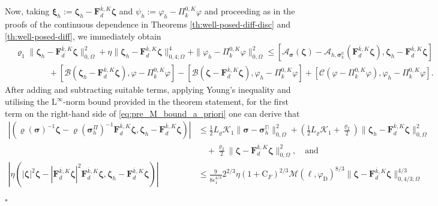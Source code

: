 \documentclass[fleqn,a4paper]{cas-sc}
\newcommand{\bF}{\mathbf{F}}
\newcommand{\bxi}{\boldsymbol{\xi}}
\newcommand{\bzeta}{\boldsymbol{\zeta}}
\newcommand{\0}{\boldsymbol{0}}
\newcommand\bbPi{\mathbb{\Pi}}
\newcommand\bsigma{\boldsymbol{\sigma}}
\numberwithin{equation}{section}
\numberwithin{figure}{section}
\newenvironment{proof}{\noindent{\it Proof.}}{\hfill$\square$}
\begin{document}
\begin{proof}
\begin{subequations}
\end{subequations}
Now, taking $\bxi_h:=\bzeta_h - \bF_d^{\overline{k},K}\bzeta$ and $\psi_h:=\varphi_h-\Pi_k^{0,K}\varphi$ and proceeding as in the proofs of the continuous dependence in Theorems \ref{th:well-posed-diff-disc} and \ref{th:well-posed-diff}, we immediately obtain
\begin{align}\label{eq:pre_M_bound_a_priori}
        &\varrho_1\|\bzeta_h - \bF_d^{\overline{k},K}\bzeta\|_{0,\Omega}^2+{\eta} \|\bzeta_h - \bF_d^{\overline{k},K}\bzeta\|_{0,4;\Omega}^4 + \|\varphi_h-\Pi_k^{0,K}\varphi\|_{0, \Omega}^2 \le  [\mathcal{A}_{\bsigma}(\bzeta)-\mathcal{A}_{h,\bsigma_h^{\bbPi}}(\bF_d^{\overline{k},K}\bzeta),\bzeta_h - \bF_d^{\overline{k},K}\bzeta]\nonumber \\
        & \qquad \qquad  +[\mathcal{B}(\bzeta_h - \bF_d^{\overline{k},K}\bzeta), \varphi-\Pi_k^{0,K}\varphi]- [\mathcal{B}(\bzeta - \bF_d^{\overline{k},K}\bzeta), \varphi_h-\Pi_k^{0,K}\varphi]+[\mathcal{C}(\varphi-\Pi_k^{0,K}\varphi),\varphi_h-\Pi_k^{0,K}\varphi].
    \end{align}
After adding and subtracting suitable terms, applying Young’s inequality and utilising the $\mathrm{L}^\infty$-norm bound provided in the theorem statement, for the first term on the right-hand side of \eqref{eq:pre_M_bound_a_priori} one can derive that 
    \begin{align*}
            |(\varrho(\bsigma)^{-1}\bzeta-\varrho(\bsigma^\Pi_h)^{-1}\bF_d^{\overline{k},K}\bzeta,\bzeta_h - \bF_d^{\overline{k},K}\bzeta)|&\leq \frac{1}{2}L_\varrho\mathcal{K}_1\|\bsigma-{\bsigma}_h^\bbPi\|^2_{0,\Omega}+\left(\frac{1}{2}L_\varrho\mathcal{K}_1+\frac{\varrho_2}{2}\right)\|\bzeta_h-\bF_d^{\overline{k},K}\bzeta\|^2_{{0,\Omega}}\nonumber\\
        &\quad  +\frac{\varrho_2}{2}\|\bzeta-\bF_d^{\overline{k},K}\bzeta\|^2_{{0,\Omega}},
       \quad \text{and}  \\
            |\eta(|\bzeta|^2\bzeta-|\bF_d^{\overline{k},K}\bzeta|^2\bF_d^{\overline{k},K}\bzeta,\bzeta_h - \bF_d^{\overline{k},K}\bzeta)|&\leq \frac{9}{8\epsilon_1^{4/3}} 2^{2/3}\eta(1+\mathrm{C}_F)^{2/3}\mathcal{M}(\ell, \varphi_{\mathrm{D}})^{8/3}\|\bzeta-\bF_d^{\overline{k},K}\bzeta\|^{4/3}_{{0,4/3;\Omega}}\nonumber\\

\end{align*}
\end{proof}
\end{document}
